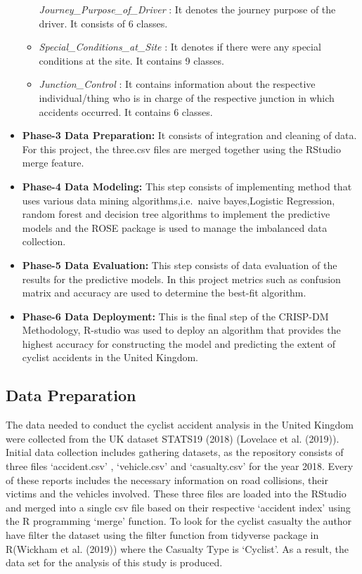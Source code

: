 \documentclass[
  a4paper,
]{article}
\begin{document}
\begin{itemize}
\begin{itemize}
    \emph{Journey\_Purpose\_of\_Driver} : It denotes the journey purpose
    of the driver. It consists of 6 classes.
  \item
    \emph{Special\_Conditions\_at\_Site} : It denotes if there were any
    special conditions at the site. It contains 9 classes.
  \item
    \emph{Junction\_Control} : It contains information about the
    respective individual/thing who is in charge of the respective
    junction in which accidents occurred. It contains 6 classes.
  \end{itemize}
\item
  \textbf{Phase-3 Data Preparation:} It consists of integration and
  cleaning of data. For this project, the three.csv files are merged
  together using the RStudio merge feature.
\item
  \textbf{Phase-4 Data Modeling:} This step consists of implementing
  method that uses various data mining algorithms,i.e.~naive
  bayes,Logistic Regression, random forest and decision tree algorithms
  to implement the predictive models and the ROSE package is used to
  manage the imbalanced data collection.
\item
  \textbf{Phase-5 Data Evaluation:} This step consists of data
  evaluation of the results for the predictive models. In this project
  metrics such as confusion matrix and accuracy are used to determine
  the best-fit algorithm.
\item
  \textbf{Phase-6 Data Deployment:} This is the final step of the
  CRISP-DM Methodology, R-studio was used to deploy an algorithm that
  provides the highest accuracy for constructing the model and
  predicting the extent of cyclist accidents in the United Kingdom.
\end{itemize}

\hypertarget{data-preparation}{%
\subsection{Data Preparation}\label{data-preparation}}

The data needed to conduct the cyclist accident analysis in the United
Kingdom were collected from the UK dataset STATS19 (2018) (Lovelace et
al. (2019)). Initial data collection includes gathering datasets, as the
repository consists of three files `accident.csv' , `vehicle.csv' and
`casualty.csv' for the year 2018. Every of these reports includes the
necessary information on road collisions, their victims and the vehicles
involved. These three files are loaded into the RStudio and merged into
a single csv file based on their respective `accident index' using the R
programming `merge' function. To look for the cyclist casualty the
author have filter the dataset using the filter function from tidyverse
package in R(Wickham et al. (2019)) where the Casualty Type is
`Cyclist'. As a result, the data set for the analysis of this study is
produced.
\end{document}
